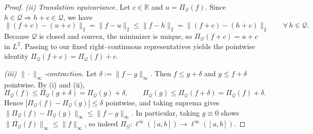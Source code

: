 \documentclass[12pt]{article}
\begin{document}
\begin{proof}
\smallskip
\noindent\emph{(ii) Translation equivariance.}
Let $c\in\mathbb R$ and $u=\Pi_{\mathcal Q}(f)$.
Since $h\in\mathcal Q\Rightarrow h+c\in\mathcal Q$, we have
\[
\|(f+c)-(u+c)\|_2=\|f-u\|_2\le \|f-h\|_2=\|(f+c)-(h+c)\|_2\qquad\forall\,h\in\mathcal Q.
\]
Because $\mathcal Q$ is closed and convex, the minimizer is unique, so $\Pi_{\mathcal Q}(f+c)=u+c$ in $L^2$.
Passing to our fixed right–continuous representatives yields the pointwise identity $\Pi_{\mathcal Q}(f+c)=\Pi_{\mathcal Q}(f)+c$.

\smallskip
\noindent\emph{(iii) $\|\cdot\|_\infty$-contraction.}
Let $\delta:=\|f-g\|_\infty$.
Then $f\le g+\delta$ and $g\le f+\delta$ pointwise.
By (i) and (ii),
\[
\Pi_{\mathcal Q}(f)\le \Pi_{\mathcal Q}(g+\delta)=\Pi_{\mathcal Q}(g)+\delta,
\qquad
\Pi_{\mathcal Q}(g)\le \Pi_{\mathcal Q}(f+\delta)=\Pi_{\mathcal Q}(f)+\delta.
\]
Hence $|\Pi_{\mathcal Q}(f)-\Pi_{\mathcal Q}(g)|\le \delta$ pointwise, and taking suprema gives
$\|\Pi_{\mathcal Q}(f)-\Pi_{\mathcal Q}(g)\|_\infty\le \|f-g\|_\infty$.
In particular, taking $g\equiv 0$ shows $\|\Pi_{\mathcal Q}(f)\|_\infty\le \|f\|_\infty$, so indeed
$\Pi_{\mathcal Q}:\ell^\infty([a,b])\to\ell^\infty([a,b])$.
\end{proof}
\end{document}
